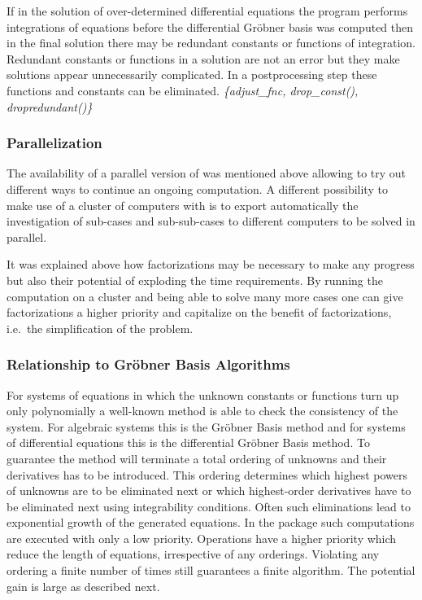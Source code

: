 If in the solution of over-determined differential equations the
program performs integrations of equations before the differential
Gr\"{o}bner basis was computed then in the final solution there may be
redundant constants or functions of integration.  Redundant constants
or functions in a solution are not an error but they make solutions
appear unnecessarily complicated.  In a postprocessing step these
functions and constants can be eliminated.  \emph{\{adjust\_fnc,
drop\_const(), dropredundant()\} }

\subsubsection{Parallelization}

The availability of a parallel version of  was
mentioned above allowing to try out different ways to continue an
ongoing computation.  A different possibility to make use of a cluster
of computers with  is to export automatically the
investigation of sub-cases and sub-sub-cases to different computers to
be solved in parallel.

It was explained above how factorizations may be necessary to make any
progress but also their potential of exploding the time requirements.
By running the computation on a cluster and being able to solve many
more cases one can give factorizations a higher priority and
capitalize on the benefit of factorizations, i.e.\ the simplification
of the problem.

\subsubsection{Relationship to Gr\"{o}bner Basis Algorithms}

For systems of equations in which the unknown constants or functions
turn up only polynomially a well-known method is able to check the
consistency of the system.  For algebraic systems this is the
Gr\"{o}bner Basis method and for systems of differential equations
this is the differential Gr\"{o}bner Basis method.  To guarantee the
method will terminate a total ordering of unknowns and their
derivatives has to be introduced.  This ordering determines which
highest powers of unknowns are to be eliminated next or which
highest-order derivatives have to be eliminated next using
integrability conditions.  Often such eliminations lead to exponential
growth of the generated equations.  In the package 
such computations are executed with only a low priority.  Operations
have a higher priority which reduce the length of equations,
irrespective of any orderings.  Violating any ordering a finite number
of times still guarantees a finite algorithm.  The potential gain is
large as described next.

